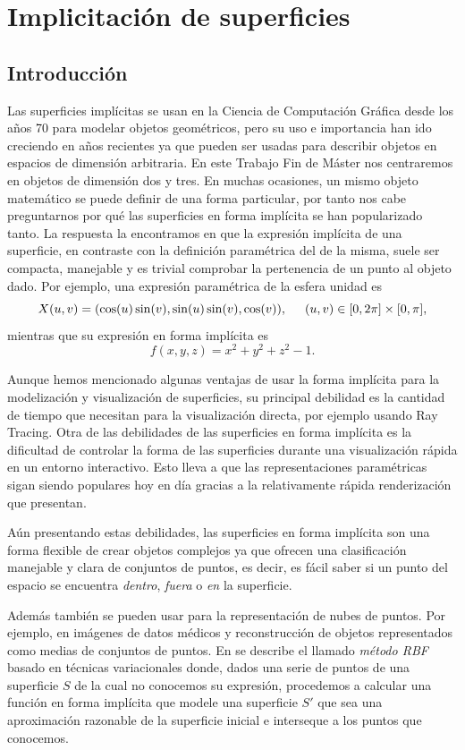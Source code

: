 \chapter{Implicitación de superficies}

\section{Introducción}

Las superficies implícitas se usan en la Ciencia de Computación Gráfica desde los años 70 para modelar objetos geométricos, pero su uso e importancia han ido creciendo en años recientes ya que pueden ser usadas para describir objetos en espacios de dimensión arbitraria. En este Trabajo Fin de Máster nos centraremos en objetos de dimensión dos y tres. En muchas ocasiones, un mismo objeto matemático se puede definir de una forma particular, por tanto nos cabe preguntarnos por qué las superficies en forma implícita se han popularizado tanto. La respuesta la encontramos en que la expresión implícita de una superficie, en contraste con la definición paramétrica del de la misma, suele ser compacta, manejable y es trivial comprobar la pertenencia de un punto al objeto dado. Por ejemplo, una expresión paramétrica de la esfera unidad es
$$X(u,v) = (\cos(u)\sin(v),\sin(u)\sin(v),\cos(v)), \hspace{0.5cm} (u,v) \in [0,2\pi] \times [0,\pi],$$
mientras que su expresión en forma implícita es
$$f(x,y,z) = x^2 + y^2 + z^2 - 1.$$

Aunque hemos mencionado algunas ventajas de usar la forma implícita para la modelización y visualización de superficies, su principal debilidad es la cantidad de tiempo que necesitan para la visualización directa, por ejemplo usando Ray Tracing\cite{Groot05}. Otra de las debilidades de las superficies en forma implícita es la dificultad de controlar la forma de las superficies durante una visualización rápida en un entorno interactivo. Esto lleva a que las representaciones paramétricas sigan siendo populares hoy en día gracias a la relativamente rápida renderización que presentan.

Aún presentando estas debilidades, las superficies en forma implícita son una forma flexible de crear objetos complejos ya que ofrecen una clasificación manejable y clara de conjuntos de puntos, es decir, es fácil saber si un punto del espacio se encuentra{ \em dentro},{ \em fuera} o{ \em en} la superficie.

Además también se pueden usar para la representación de nubes de puntos. Por ejemplo, en imágenes de datos médicos y reconstrucción de objetos representados como medias de conjuntos de puntos\cite{Benedet05,Peiro06}. En \cite{Uhlir03} se describe el llamado{ \em método RBF} basado en técnicas variacionales donde, dados una serie de puntos de una superficie $S$ de la cual no conocemos su expresión, procedemos a calcular una función en forma implícita que modele una superficie $S'$ que sea una aproximación razonable de la superficie inicial e interseque a los puntos que conocemos.

